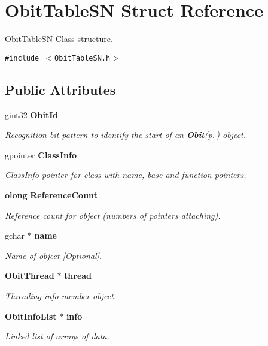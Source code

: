\section{Obit\-Table\-SN Struct Reference}
\label{structObitTableSN}
Obit\-Table\-SN Class structure.  


{\tt \#include $<$Obit\-Table\-SN.h$>$}

\subsection*{Public Attributes}
\begin{CompactItemize}
\item 
gint32 {\bf Obit\-Id}
\begin{CompactList}\small\item\em Recognition bit pattern to identify the start of an {\bf Obit}{\rm (p.\,\pageref{structObit})} object. \item\end{CompactList}\item 
gpointer {\bf Class\-Info}
\begin{CompactList}\small\item\em Class\-Info pointer for class with name, base and function pointers. \item\end{CompactList}\item 
{\bf olong} {\bf Reference\-Count}
\begin{CompactList}\small\item\em Reference count for object (numbers of pointers attaching). \item\end{CompactList}\item 
gchar $\ast$ {\bf name}
\begin{CompactList}\small\item\em Name of object [Optional]. \item\end{CompactList}\item 
{\bf Obit\-Thread} $\ast$ {\bf thread}
\begin{CompactList}\small\item\em Threading info member object. \item\end{CompactList}\item 
{\bf Obit\-Info\-List} $\ast$ {\bf info}
\begin{CompactList}\small\item\em Linked list of arrays of data. \item\end{CompactList}\item 

\end{CompactItemize}

